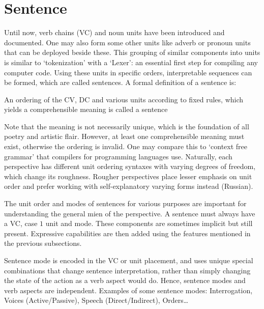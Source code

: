 \section{Sentence} \label{sec:enstce}
Until now, verb chains (VC) and noun units have been introduced and documented. One may also form some other units like adverb or pronoun units that can be deployed beside these. This grouping of similar components into units is similar to `tokenization' with a `Lexer': an essential first step for compiling any computer code. Using these units in specific orders, interpretable sequences can be formed, which are called sentences. A formal definition of a sentence is:
\begin{syntax}
    An ordering of the CV, DC and various  units according to fixed rules,  which yields a comprehensible meaning is called a sentence
\end{syntax}
Note that the meaning is not necessarily unique, which is the foundation of all poetry and artistic flair. However, at least one comprehensible meaning must exist, otherwise the ordering is invalid. One may compare this to `context free grammar' that compilers for programming languages use. Naturally, each perspective has different unit ordering syntaxes with varying degrees of freedom, which change its roughness. Rougher perspectives place lesser emphasis on unit order and prefer working with self-explanatory varying forms instead (Russian).

The unit order and modes of sentences for various purposes are important for understanding the general mien of the perspective.  A sentence must always have a VC,  case $1$ unit and mode. These components are sometimes implicit but still present. Expressive capabilities are then added using the features mentioned in the previous subsections.

Sentence mode is  encoded in the VC or unit placement, and uses  unique special combinations that change sentence interpretation, rather than simply changing the state of the action as a verb aspect would do. Hence, sentence modes and verb aspects are independent. Examples of some sentence modes: Interrogation, Voices (Active/Passive), Speech (Direct/Indirect), Orders\ldots

